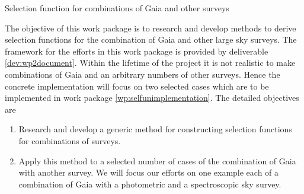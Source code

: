 \begin{workpackage}{Selection function for combinations of Gaia and other surveys}
  \label{wp:selfuncombine}
  \wpend{\duration} %

  \makewptable %

  \begin{wpobjectives}
    The objective of this work package is to research and develop methods to derive selection functions for the combination of Gaia and other large sky surveys. The framework for the efforts in this work package is provided by deliverable \ref{dev:wp2document}. Within the lifetime of the project it is not realistic to make combinations of Gaia and an arbitrary numbers of other surveys. Hence the concrete implementation will focus on two selected cases which are to be implemented in work package \ref{wp:selfunimplementation}. The detailed objectives are
    \begin{enumerate}
      \item Research and develop a generic method for constructing selection functions for combinations of surveys.
      \item Apply this method to a selected number of cases of the combination of Gaia with another survey. We will focus our efforts on one example each of a combination of Gaia with a photometric and a spectroscopic sky survey.
    \end{enumerate}
  \end{wpobjectives}

  \begin{wpdescription}
\end{wpdescription}
\end{workpackage}
